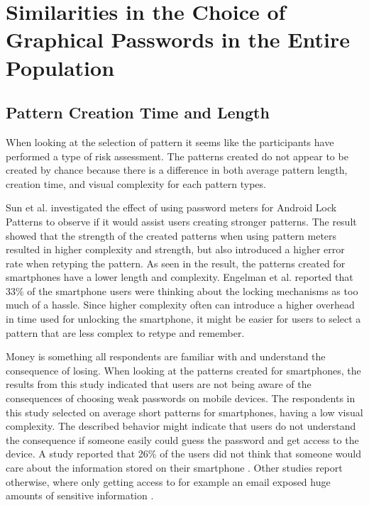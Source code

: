   \clearpage
  \section{Similarities in the Choice of Graphical Passwords in the Entire Population}

    \subsection{Pattern Creation Time and Length}

      When looking at the selection of pattern it seems like the participants have performed a type of risk assessment. The patterns created do not appear to be created by chance because there is a difference in both average pattern length, creation time, and visual complexity for each pattern types.

      Sun et al. \cite{Sun} investigated the effect of using password meters for Android Lock Patterns to observe if it would assist users creating stronger patterns. The result showed that the strength of the created patterns when using pattern meters resulted in higher complexity and strength, but also introduced a higher error rate when retyping the pattern. As seen in the result, the patterns created for smartphones have a lower length and complexity. Engelman et al. \cite{Egelman} reported that 33\% of the smartphone users were thinking about the locking mechanisms as too much of a hassle. Since higher complexity often can introduce a higher overhead in time used for unlocking the smartphone, it might be easier for users to select a pattern that are less complex to retype and remember.   

      Money is something all respondents are familiar with and understand the consequence of losing. When looking at the patterns created for smartphones, the results from this study indicated that users are not being aware of the consequences of choosing weak passwords on mobile devices. The respondents in this study selected on average short patterns for smartphones, having a low visual complexity. The described behavior might indicate that users do not understand the consequence if someone easily could guess the password and get access to the device. A study reported that 26\% of the users did not think that someone would care about the information stored on their smartphone \cite{Egelman}. Other studies report otherwise, where only getting access to for example an email exposed huge amounts of sensitive information \cite{Egelman}. 

